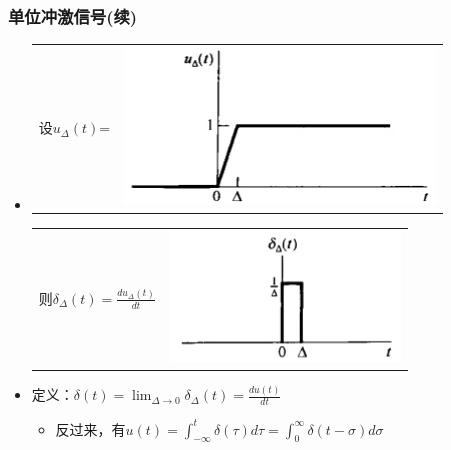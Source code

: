 \documentclass[CJKutf8,xcolor=pdftex,dvipsnames,table]{beamer}
\begin{document}
\begin{CJK*}{UTF8}{song}
  \begin{frame}
    \frametitle{单位冲激信号(续)}
    \begin{itemize}
    \item
	\begin{tabular}{ll}
	\raisebox{-.5\height}

    设$u_{\Delta}(t)$=

&
    \includegraphics[valign=m,scale=.4]{uDelta}    \\
    \end{tabular}       
    

	\begin{tabular}{ll}
	\raisebox{-.5\height}

    则$\delta_{\Delta}(t)=\frac{du_{\Delta}(t)}{dt}$

&
    \includegraphics[valign=m,scale=.4]{deltaDelta}    \\
    \end{tabular}       
    
    \item 定义：$\delta(t)=\lim_{\Delta\to 0}\delta_{\Delta}(t)=\frac{du(t)}{dt}$
    \begin{itemize}
    \item 反过来，有$u(t)=\int_{-\infty}^{t}\delta(\tau)d\tau=\int_{0}^{\infty}\delta(t-\sigma)d\sigma$
    \end{itemize}
    \end{itemize}
  \end{frame}


\end{CJK*}
\end{document}
